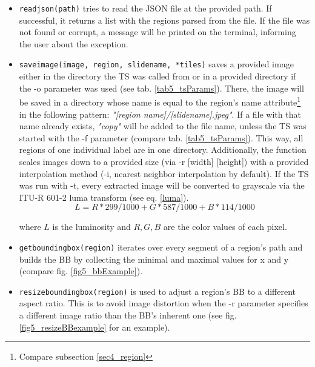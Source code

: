 \begin{itemize}
	\item \texttt{read{\textunderscore}json(path)} tries to read the JSON file at the provided path. If successful, it returns a list with the regions parsed from the file. If the file was not found or corrupt, a message will be printed on the terminal, informing the user about the exception.
	
	\item \texttt{save{\textunderscore}image(image, region, slide{\textunderscore}name, *tiles)} saves a provided image either in the directory the TS was called from or in a provided directory if the -o parameter was used (see tab. \ref{tab5_tsParams}). There, the image will be saved in a directory whose name is equal to the region's name attribute\footnote{Compare subsection \ref{sec4_region}} in the following pattern: \emph{"[region name]/[slide{\textunderscore}name].jpeg"}. If a file with that name already exists, \emph{"{\textunderscore}copy"} will be added to the file name, unless the TS was started with the -f parameter (compare tab. \ref{tab5_tsParams}). This way, all regions of one individual label are in one directory. Additionally, the function scales images down to a provided size (via -r [width] [height]) with a provided interpolation method (-i, nearest neighbor interpolation by default). If the TS was run with -t, every extracted image will be converted to grayscale via the ITU-R 601-2 luma transform\cite{ITUR94} (see eq. \ref{luma}).
	\begin{equation}\label{luma}
		L = R * 299/1000 + G * 587/1000 + B * 114/1000
	\end{equation}
	
	where $L$ is the luminosity and $R, G, B$ are the color values of each pixel.
	
	\item \texttt{get{\textunderscore}bounding{\textunderscore}box(region)} iterates over every segment of a region's path and builds the BB by collecting the minimal and maximal values for x and y (compare fig. \ref{fig5_bbExample}).
	
	\item \texttt{resize{\textunderscore}bounding{\textunderscore}box(region)} is used to adjust a region's BB to a different aspect ratio. This is to avoid image distortion when the -r parameter specifies a different image ratio than the BB's inherent one (see fig. \ref{fig5_resizeBBexample} for an example).
	

\end{itemize}

